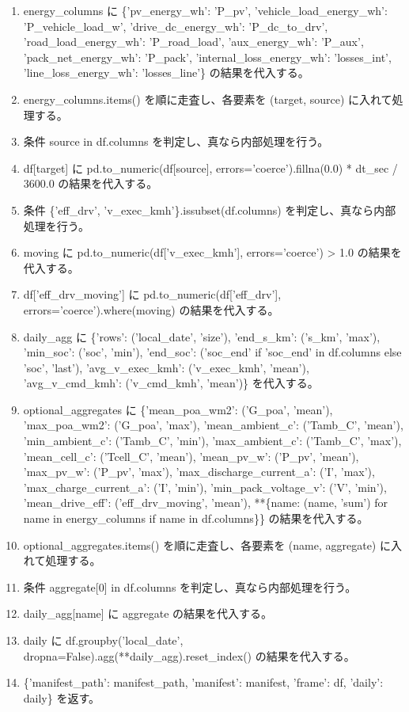 \documentclass[a4paper,11pt]{article}
\begin{document}
\begin{enumerate}[leftmargin=1.8em]
\item   energy\_columns に \{'pv\_energy\_wh': 'P\_pv', 'vehicle\_load\_energy\_wh': 'P\_vehicle\_load\_w', 'drive\_dc\_energy\_wh': 'P\_dc\_to\_drv', 'road\_load\_energy\_wh': 'P\_road\_load', 'aux\_energy\_wh': 'P\_aux', 'pack\_net\_energy\_wh': 'P\_pack', 'internal\_loss\_energy\_wh': 'losses\_int', 'line\_loss\_energy\_wh': 'losses\_line'\} の結果を代入する。
\item   energy\_columns.items() を順に走査し、各要素を (target, source) に入れて処理する。
\item     条件 source in df.columns を判定し、真なら内部処理を行う。
\item       df[target] に pd.to\_numeric(df[source], errors='coerce').fillna(0.0) * dt\_sec / 3600.0 の結果を代入する。
\item   条件 \{'eff\_drv', 'v\_exec\_kmh'\}.issubset(df.columns) を判定し、真なら内部処理を行う。
\item     moving に pd.to\_numeric(df['v\_exec\_kmh'], errors='coerce') > 1.0 の結果を代入する。
\item     df['eff\_drv\_moving'] に pd.to\_numeric(df['eff\_drv'], errors='coerce').where(moving) の結果を代入する。
\item   daily\_agg に \{'rows': ('local\_date', 'size'), 'end\_s\_km': ('s\_km', 'max'), 'min\_soc': ('soc', 'min'), 'end\_soc': ('soc\_end' if 'soc\_end' in df.columns else 'soc', 'last'), 'avg\_v\_exec\_kmh': ('v\_exec\_kmh', 'mean'), 'avg\_v\_cmd\_kmh': ('v\_cmd\_kmh', 'mean')\} を代入する。
\item   optional\_aggregates に \{'mean\_poa\_wm2': ('G\_poa', 'mean'), 'max\_poa\_wm2': ('G\_poa', 'max'), 'mean\_ambient\_c': ('Tamb\_C', 'mean'), 'min\_ambient\_c': ('Tamb\_C', 'min'), 'max\_ambient\_c': ('Tamb\_C', 'max'), 'mean\_cell\_c': ('Tcell\_C', 'mean'), 'mean\_pv\_w': ('P\_pv', 'mean'), 'max\_pv\_w': ('P\_pv', 'max'), 'max\_discharge\_current\_a': ('I', 'max'), 'max\_charge\_current\_a': ('I', 'min'), 'min\_pack\_voltage\_v': ('V', 'min'), 'mean\_drive\_eff': ('eff\_drv\_moving', 'mean'), **\{name: (name, 'sum') for name in energy\_columns if name in df.columns\}\} の結果を代入する。
\item   optional\_aggregates.items() を順に走査し、各要素を (name, aggregate) に入れて処理する。
\item     条件 aggregate[0] in df.columns を判定し、真なら内部処理を行う。
\item       daily\_agg[name] に aggregate の結果を代入する。
\item   daily に df.groupby('local\_date', dropna=False).agg(**daily\_agg).reset\_index() の結果を代入する。
\item \{'manifest\_path': manifest\_path, 'manifest': manifest, 'frame': df, 'daily': daily\} を返す。
            \end{enumerate}
\end{document}
